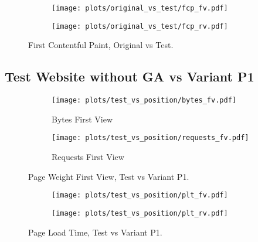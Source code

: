 \begin{figure}
	\centering
	\begin{subfigure}{.5\textwidth}
		\centering
		\texttt{[image: plots/original\_vs\_test/fcp\_fv.pdf]}
		\label{fig:sub1}
	\end{subfigure}%
	\begin{subfigure}{.5\textwidth}
		\centering
		\texttt{[image: plots/original\_vs\_test/fcp\_rv.pdf]}
		\label{fig:sub2}
	\end{subfigure}
	\caption{First Contentful Paint, Original vs Test.}
	\label{figure:fcp_original_test}
\end{figure}


\clearpage



\subsection{Test Website without GA vs Variant P1}

\begin{figure}
	\centering
	\begin{subfigure}{.5\textwidth}
		\centering
		\texttt{[image: plots/test\_vs\_position/bytes\_fv.pdf]}
		\caption{Bytes First View}
		\label{fig:sub1}
	\end{subfigure}%
	\begin{subfigure}{.5\textwidth}
		\centering
		\texttt{[image: plots/test\_vs\_position/requests\_fv.pdf]}
		\caption{Requests First View}
		\label{fig:sub2}
	\end{subfigure}
	\caption{Page Weight First View, Test vs Variant P1.}
	\label{figure:plt_original_test}
\end{figure}


\begin{figure}
	\centering
	\begin{subfigure}{.5\textwidth}
		\centering
		\texttt{[image: plots/test\_vs\_position/plt\_fv.pdf]}
		\label{fig:sub1}
	\end{subfigure}%
	\begin{subfigure}{.5\textwidth}
		\centering
		\texttt{[image: plots/test\_vs\_position/plt\_rv.pdf]}
		\label{fig:sub2}
	\end{subfigure}
	\caption{Page Load Time, Test vs Variant P1.}
	\label{figure:plt_original_test}
\end{figure}


